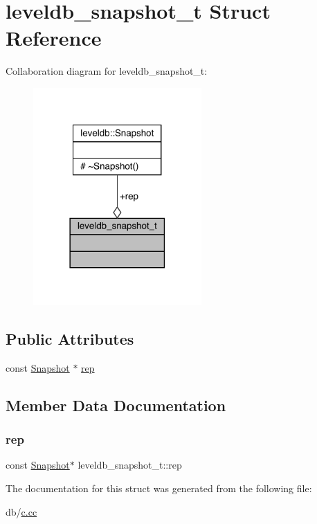\hypertarget{structleveldb__snapshot__t}{}\section{leveldb\+\_\+snapshot\+\_\+t Struct Reference}
\label{structleveldb__snapshot__t}


Collaboration diagram for leveldb\+\_\+snapshot\+\_\+t\+:
\nopagebreak
\begin{figure}[H]
\begin{center}
\leavevmode
\includegraphics[width=182pt]{structleveldb__snapshot__t__coll__graph}
\end{center}
\end{figure}
\subsection*{Public Attributes}
\begin{DoxyCompactItemize}
\item 
const \mbox{\hyperlink{classleveldb_1_1_snapshot}{Snapshot}} $\ast$ \mbox{\hyperlink{structleveldb__snapshot__t_a36f57ffdcd88fa73322d8e2e637e3b6a}{rep}}
\end{DoxyCompactItemize}


\subsection{Member Data Documentation}
\mbox{\label{structleveldb__snapshot__t_a36f57ffdcd88fa73322d8e2e637e3b6a}} 
\subsubsection{\texorpdfstring{rep}{rep}}
{\footnotesize\ttfamily const \mbox{\hyperlink{classleveldb_1_1_snapshot}{Snapshot}}$\ast$ leveldb\+\_\+snapshot\+\_\+t\+::rep}



The documentation for this struct was generated from the following file\+:\begin{DoxyCompactItemize}
\item 
db/\mbox{\hyperlink{c_8cc}{c.\+cc}}\end{DoxyCompactItemize}
